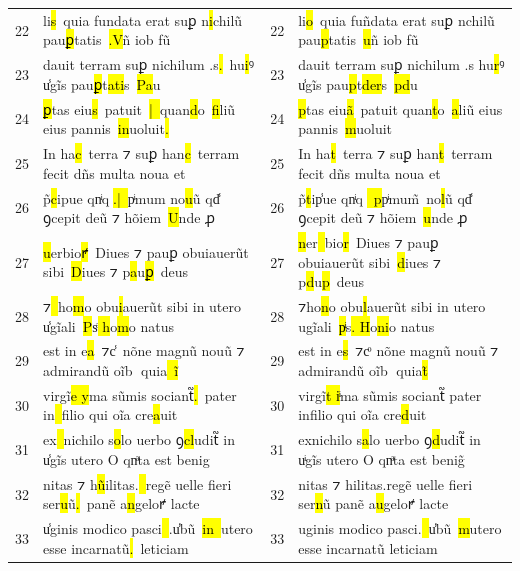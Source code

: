 \documentclass{article}
\begin{document}
\begin{table}[H]
{{\begin{tabular}{rl|rl}
            22 & li\hl{s}~quia fundata erat suꝑ n\hl{i}chilũ pau\hl{ꝑ}tatis~\hl{.V}ñ iob fũ & 22 & li\hl{o}~quia fun\hl{̃}data erat suꝑ nchilũ pau\hl{p}tatis~\hl{u}ñ iob fũ \\
            23 & dauit terram suꝑ nichilum .s\hl{.}~hu\hl{i}ꝰ u̾gĩs pau\hl{ꝑ}t\hl{ati}s~\hl{Pa}u & 23 & dauit terram suꝑ nichilum .s hu\hl{r}ꝰ u̾gĩs pau\hl{p}t\hl{der}s~\hl{pd}u \\
            24 & \hl{ꝑ}tas eiu\hl{s}~patuit~\hl{|~}quan\hl{d}o~\hl{fi}liũ eius pannis~\hl{in}uoluit\hl{.} & 24 & \hl{p}tas eiu\hl{ã}~patuit quan\hl{t}o~\hl{a}liũ eius pannis~\hl{m}uoluit \\
            25 & In ha\hl{c}~terra ⁊ suꝑ han\hl{c}~terram fecit dñs multa noua et & 25 & In ha\hl{t}~terra ⁊ suꝑ han\hl{t}~terram fecit dñs multa noua et \\
            26 & p̃\hl{c}ipue qnͥq\hl{.|~}pͥmum no\hl{u}ũ qd̾ ꝯcepit deũ ⁊ hõiem~\hl{U}nde ꝓ & 26 & p̃\hl{t}ip\hl{̾}ue qnͥq\hl{~p}pͥmum\hl{̃}~no\hl{l}ũ qd̾ ꝯcepit deũ ⁊ hõiem~\hl{u}nde ꝓ \\
            27 & \hl{u}erbio\hl{ꝵ}~Diues ⁊ pauꝑ obuiauerũt sibi~\hl{D}iues ⁊ p\hl{a}u\hl{ꝑ}~deus & 27 & \hl{n}er\hl{~}bio\hl{r}~Diues ⁊ pauꝑ obuiauerũt sibi~\hl{d}iues ⁊ p\hl{d}u\hl{p}~deus \\
            28 & ⁊\hl{~}ho\hl{m}o obu\hl{i}auerũt sibi in utero u\hl{̾}gĩali~\hl{P}s\hl{ͣ h}o\hl{m}o natus & 28 & ⁊ho\hl{n}o obu\hl{l}auerũt sibi in utero ugĩali~\hl{pͥ}s\hl{. H}o\hl{ni}o natus \\
            29 & est in e\hl{a}~⁊c\hl{̾}~nõne magnũ nouũ ⁊ admirandũ oĩb quia\hl{~i}̃ & 29 & est in e\hl{s}~⁊c\hl{ͦ}~nõne magnũ nouũ ⁊ admirandũ oĩb quia\hl{t}̃ \\
            30 & virgĩ\hl{e y}ma sũmis sociant᷑\hl{.}~pater in\hl{~}filio qui oĩa cre\hl{a}uit & 30 & virgĩ\hl{t iͥ}ma sũmis sociant᷑ pater infilio qui oĩa cre\hl{d}uit \\
            31 & ex\hl{~}nichilo s\hl{o}lo uerbo ꝯ\hl{cl}udit᷑ in u\hl{̾}gĩs utero O qnͣta est benig & 31 & exnichilo s\hl{a}lo uerbo ꝯ\hl{d}udit᷑ in u\hl{ͥ}gĩs utero O qnͣta est benig\hl{̃} \\
            32 & nitas ⁊ h\hl{ũ}ilitas.\hl{~}regẽ uelle fieri ser\hl{u}ũ\hl{.}~panẽ a\hl{n}geloꝵ lacte & 32 & nitas ⁊ hilitas.regẽ uelle fieri ser\hl{n}ũ panẽ a\hl{u}geloꝵ lacte \\
            33 & u\hl{̾}ginis modico pasci\hl{~}.u̾bũ~\hl{in~}utero esse incarnatũ\hl{.}~leticiam & 33 & uginis modico pasci.\hl{~}u̾bũ~\hl{m}utero esse incarnatũ leticiam \\

\end{tabular}}}
\end{table}
\end{document}
